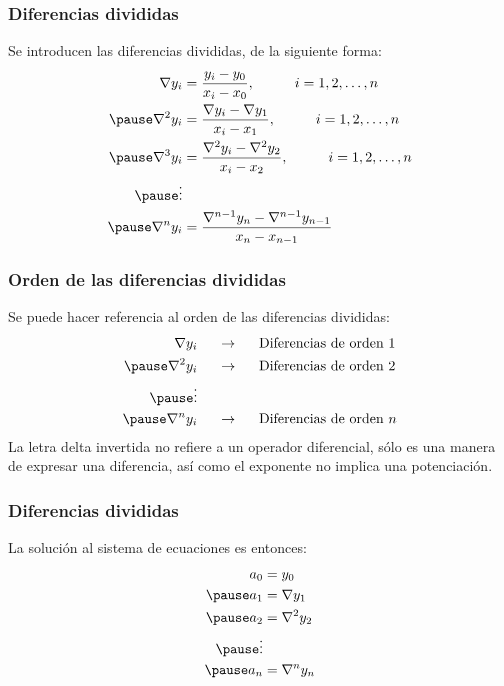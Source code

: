 \documentclass[12pt]{beamer}
\begin{document}
\begin{frame}[fragile]
\frametitle{Diferencias divididas}
Se introducen las diferencias divididas, de la siguiente forma:
\pause
\begin{eqnarray*}
\begin{aligned}
\nabla y_{i} &= \dfrac{y_{i} - y_{0}}{x_{i} - x_{0}}, \hspace{1cm} i = 1, 2, \ldots, n \\ \pause
\nabla^{2} y_{i} &= \dfrac{\nabla y_{i} - \nabla y_{1}}{x_{i} - x_{1}}, \hspace{1cm} i = 1,2,\ldots,n \\ \pause
\nabla^{3} y_{i} &= \dfrac{\nabla^{2} y_{i} - \nabla^{2} y_{2}}{x_{i} - x_{2}}, \hspace{1cm} i = 1,2,\ldots,n \\ \pause
\vdots \\ \pause
\nabla^{n} y_{i} &= \dfrac{\nabla^{n-1} y_{n} - \nabla^{n-1} y_{n-1}}{x_{n} - x_{n-1}}
\end{aligned}
\end{eqnarray*}
\end{frame}
\begin{frame}
\frametitle{Orden de las diferencias divididas}
Se puede hacer referencia al orden de las diferencias divididas:
\pause
\begin{eqnarray*}
\begin{aligned}
\nabla y_{i} & \hspace{0.5cm} \rightarrow \hspace{0.5cm} \text{Diferencias de orden 1} \\  \pause
\nabla^{2} y_{i} & \hspace{0.5cm} \rightarrow \hspace{0.5cm} \text{Diferencias de orden 2} \\ \pause
\vdots \\ \pause
\nabla^{n} y_{i} & \hspace{0.5cm} \rightarrow \hspace{0.5cm} \text{Diferencias de orden } n
\end{aligned}
\end{eqnarray*}
\pause
La letra delta invertida no refiere a un operador diferencial, sólo es una manera de expresar una diferencia, así como el exponente no implica una potenciación.
\end{frame}
\begin{frame}
\frametitle{Diferencias divididas}
La solución al sistema de ecuaciones es entonces:
\pause
\begin{eqnarray*}
\begin{aligned}
a_{0} &= y_{0} \\ \pause
a_{1} &= \nabla y_{1} \\ \pause
a_{2} &= \nabla^{2} y_{2} \\ \pause
\vdots \\ \pause
a_{n} &= \nabla^{n} y_{n}
\end{aligned}
\end{eqnarray*}
\end{frame}
\end{document}
